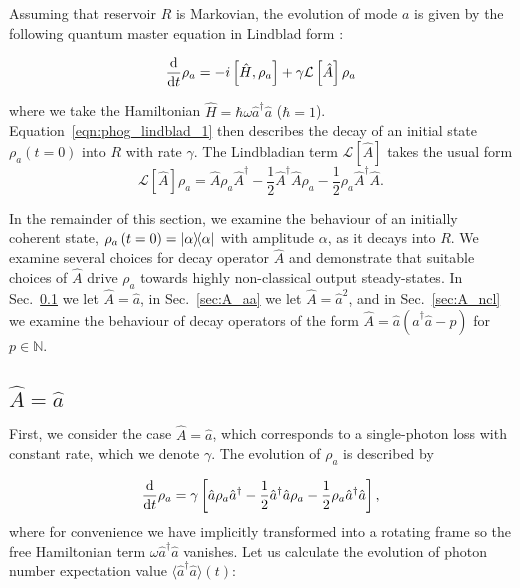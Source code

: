 Assuming that reservoir $R$ is Markovian, the evolution of mode $a$ is given by the following quantum master equation in Lindblad form \cite{Carmichael1999a, Breuer2002}:


\begin{equation}\label{eqn:phog_lindblad_1}
\frac{\mathrm{d}}{\mathrm{d}t} \rho_a =  - i \left[\hat{H}, \rho_a\right] + \gamma \mathcal{L}\left[\hat{A}\right]\rho_a
\end{equation}

\noindent where we take the Hamiltonian $\hat{H} = \hbar \omega \hat{a}^\dagger \hat{a}$ ($\hbar = 1$). Equation~\ref{eqn:phog_lindblad_1} then describes the decay of an initial state $\rho_a\left(t=0\right)$ into $R$ with rate $\gamma$. The Lindbladian term $\mathcal{L}\left[\hat{A}\right]$ takes the usual form %
\begin{equation}\label{eqn:phog_lindbladian_form}
\mathcal{L}\left[\hat{A}\right]\rho_a = \hat{A}\rho_a\hat{A}^\dagger - \frac{1}{2} \hat{A}^\dagger \hat{A} \rho_a - \frac{1}{2} \rho_a \hat{A}^\dagger \hat{A}.
\end{equation}

\noindent In the remainder of this section, we examine the behaviour of an initially coherent state, $\rho_a\left(t=0\right) = \dyad{\alpha}$ with amplitude $\alpha$, as it decays into $R$. We examine several choices for decay operator $\hat{A}$ and demonstrate that suitable choices of $\hat{A}$ drive $\rho_a$ towards highly non-classical output steady-states. In Sec.~\ref{sec:A_a} we let $\hat{A} = \hat{a}$, in Sec.~\ref{sec:A_aa} we let $\hat{A} = \hat{a}^2$, and in Sec.~\ref{sec:A_ncl} we examine the behaviour of decay operators of the form $\hat{A} = \hat{a} \left(\hat{a}^\dagger \hat{a} - p\right)$ for $p \in \mathbb{N}$.



\subsection{$\hat{A} = \hat{a}$}\label{sec:A_a}
First, we consider the case $\hat{A}=\hat{a}$, which corresponds to a single-photon loss with constant rate, which we denote $\gamma$. The evolution of $\rho_a$ is described by

\begin{equation}\label{eqn:phog_lindblad_single_photon_loss}
\frac{\mathrm{d}}{\mathrm{d}t} \rho_a = \gamma\left[\hat{a}\rho_a \hat{a}^\dagger - \frac{1}{2} \hat{a}^\dagger \hat{a} \rho_a - \frac{1}{2} \rho_a \hat{a}^\dagger \hat{a}\right],
\end{equation}
where for convenience we have implicitly transformed into a rotating frame so the free Hamiltonian term $\omega \hat{a}^\dagger \hat{a}$ vanishes. Let us calculate the evolution of photon number expectation value $\langle \hat{a}^\dagger \hat{a}\rangle\left(t\right)$:

